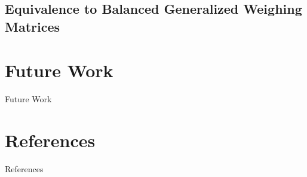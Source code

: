 \documentclass{beamer}
\begin{document}

\subsection{Equivalence to Balanced Generalized Weighing Matrices}

\begin{frame}


  
\end{frame}


\section{Future Work}

\begin{frame}{Future Work}
\end{frame}


\section{References}

\begin{frame}{References}
  
  
\end{frame}
\end{document}
